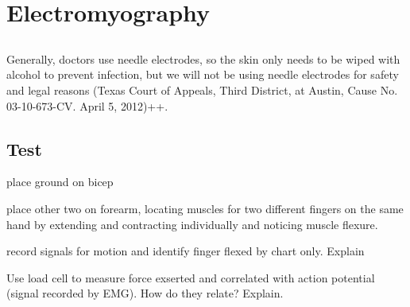 \chapter{Electromyography}

\section{}


Generally, doctors use needle electrodes, so the skin only needs to be wiped with alcohol to prevent infection, but we will not be using needle electrodes for safety and legal reasons (Texas Court of Appeals, Third District, at Austin, Cause No. 03-10-673-CV. April 5, 2012)++.

\section{Test}

place ground on bicep

place other two on forearm, locating muscles for two different fingers on the same hand by extending and contracting individually and noticing muscle flexure.

record signals for motion and identify finger flexed by chart only.  Explain

Use load cell to measure force exserted and correlated with action potential (signal recorded by EMG).  How do they relate?  Explain. 